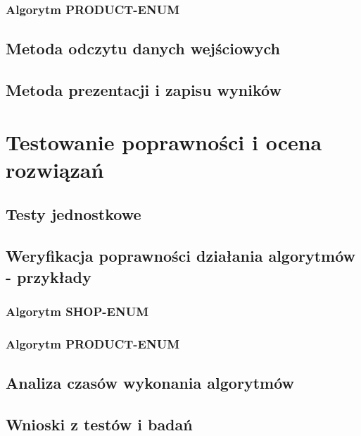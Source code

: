 \documentclass[a4paper]{article}
\let\oldsection\section
\renewcommand\section{\clearpage\oldsection}
\begin{document}
\subsubsection{Algorytm PRODUCT-ENUM}
\subsection{Metoda odczytu danych wejściowych}
\subsection{Metoda prezentacji i zapisu wyników}

\section{Testowanie poprawności i ocena rozwiązań}
\subsection{Testy jednostkowe}
\subsection{Weryfikacja poprawności działania algorytmów - przykłady}
\subsubsection{Algorytm SHOP-ENUM}
\subsubsection{Algorytm PRODUCT-ENUM}
\subsection{Analiza czasów wykonania algorytmów}
\subsection{Wnioski z testów i badań}
\end{document}

